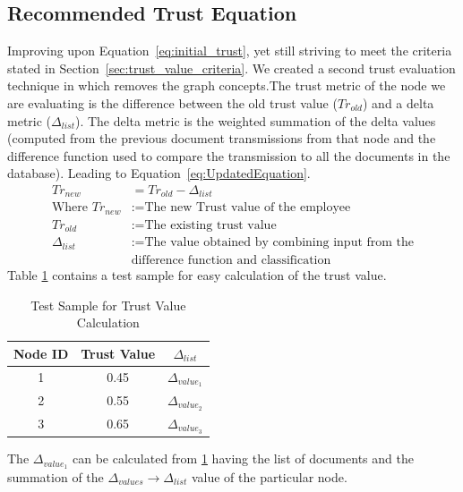 \subsection{Recommended Trust Equation}
\label{sec:recommend_trust_equation}
Improving upon Equation~\ref{eq:initial_trust}, yet still striving to meet the
criteria stated in Section~\ref{sec:trust_value_criteria}. We created a second
trust evaluation technique in which removes the graph concepts.The trust metric
of the node we are evaluating is the difference between the old trust value
(\(Tr_{old}\)) and a delta metric (\(\Delta_{list}\)). The delta
metric is the weighted summation of the delta values (computed from the
previous document transmissions from that node and the difference function used to
compare the transmission to all the documents in the database).  Leading to
Equation~\ref{eq:UpdatedEquation}.
\begin{equation}
    \label{eq:UpdatedEquation}
    \begin{aligned}
        Tr_{new} &= Tr_{old} - \Delta_{list} \\
        \text{Where } Tr_{new} &:= \text{The new Trust value of the employee} \\
        Tr_{old} &:= \text{The existing trust value} \\
        \Delta_{list} &:= \text{The value obtained by combining input from the} \\
        &\text{difference function and classification}
    \end{aligned}
\end{equation}
Table \ref{tab:trust_value_calculation} contains a test sample for easy calculation of the trust value.

\begin{table}[h!]
    \centering
    \begin{tabular}{c | c | c}
        \hline 
        Node ID & Trust Value & \(\Delta_{list}\) \\
        \hline \hline
        1 & 0.45 & \(\Delta_{value_1}\) \\
        2 & 0.55 & \(\Delta_{value_2}\) \\
        3 & 0.65 & \(\Delta_{value_3}\) \\
    \end{tabular}
    \caption{Test Sample for Trust Value Calculation}
    \label{tab:trust_value_calculation}
\end{table}

The \(\Delta_{value_1}\) can be calculated from \ref{tab:trust_value_calculation} having the list of
documents and the summation of the \(\Delta_{values} \to \Delta_{list} \) value of the particular node. 

